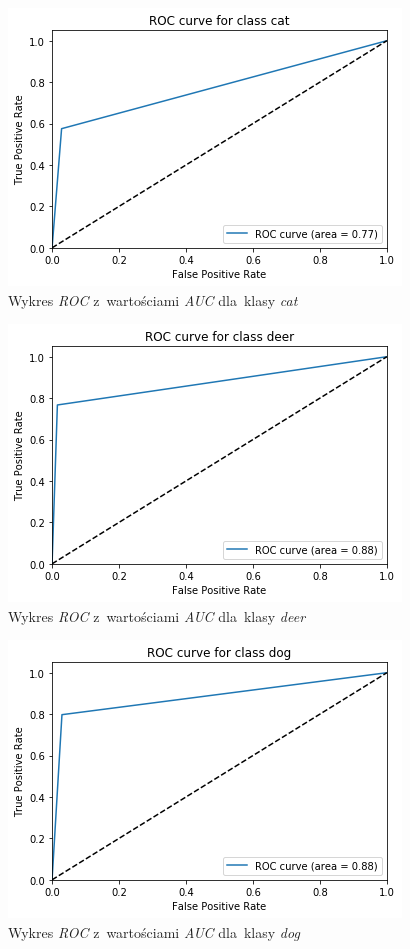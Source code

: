\documentclass[11pt, a4paper]{article}
\begin{document}
\begin{figure}[H]
\centering
    \includegraphics[scale=0.8]{roc_3.png}
    \caption{Wykres \textit{ROC} z~wartościami \textit{AUC} dla~klasy \textit{cat}}
\end{figure}
\begin{figure}[H]
\centering
    \includegraphics[scale=0.8]{roc_4.png}
    \caption{Wykres \textit{ROC} z~wartościami \textit{AUC} dla~klasy \textit{deer}}
\end{figure}
\begin{figure}[H]
\centering
    \includegraphics[scale=0.8]{roc_5.png}
    \caption{Wykres \textit{ROC} z~wartościami \textit{AUC} dla~klasy \textit{dog}}
\end{figure}
\end{document}
